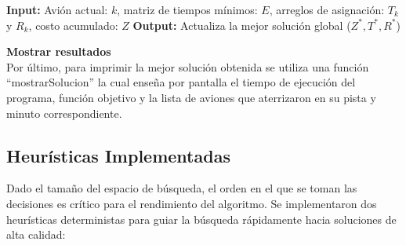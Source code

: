 \documentclass[12pt]{article}
\begin{document}
\begin{algorithm}[H] 
\vspace{2mm}
\textbf{Input:} Avión actual: $k$, matriz de tiempos mínimos: $E$, arreglos de asignación: $T_k$ y $R_k$, costo acumulado: $Z$\;
\textbf{Output:} Actualiza la mejor solución global ($Z^*, T^*, R^*$)\;
\vspace{2mm}
\BlankLine
{}
\BlankLine
{}
\BlankLine
{}
\caption{solveMFC (Búsqueda Central Exacta)}
\end{algorithm}

\textbf{Mostrar resultados}\\
Por último, para imprimir la mejor solución obtenida se utiliza una función ``mostrarSolucion'' la cual enseña por pantalla el tiempo de ejecución del programa, función objetivo y la lista de aviones que aterrizaron en su pista y minuto correspondiente.

\subsection{Heurísticas Implementadas}
\label{sec:heuristicas}

Dado el tamaño del espacio de búsqueda, el orden en el que se toman las decisiones es crítico para el rendimiento del algoritmo. Se implementaron dos heurísticas deterministas para guiar la búsqueda rápidamente hacia soluciones de alta calidad:
\end{document}
